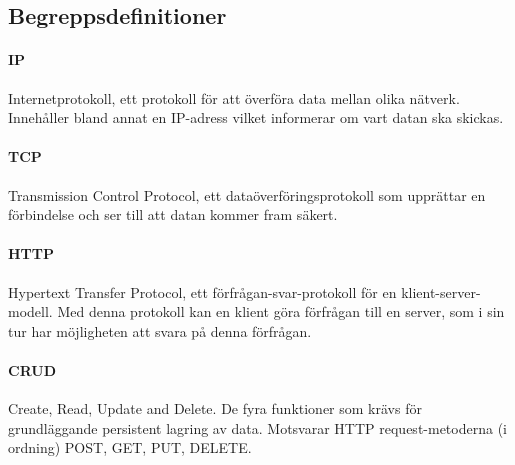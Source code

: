 \subsection{Begreppsdefinitioner}
\label{subsec:definitions}

\paragraph{IP} 
Internetprotokoll, ett protokoll för att överföra data mellan olika nätverk. Innehåller bland annat en IP-adress vilket informerar om vart datan ska skickas. \parencite{inetF1}

\paragraph{TCP}
Transmission Control Protocol, ett dataöverföringsprotokoll som upprättar en förbindelse och ser till att datan kommer fram säkert. \parencite{inetF1}

\paragraph{HTTP}
Hypertext Transfer Protocol, ett förfrågan-svar-protokoll för en klient-server-modell. Med denna protokoll kan en klient göra förfrågan till en server, som i sin tur har möjligheten att svara på denna förfrågan. \parencite{http}

\paragraph{CRUD}
Create, Read, Update and Delete. De fyra funktioner som krävs för grundläggande persistent lagring av data. Motsvarar HTTP request-metoderna (i ordning) POST, GET, PUT, DELETE.